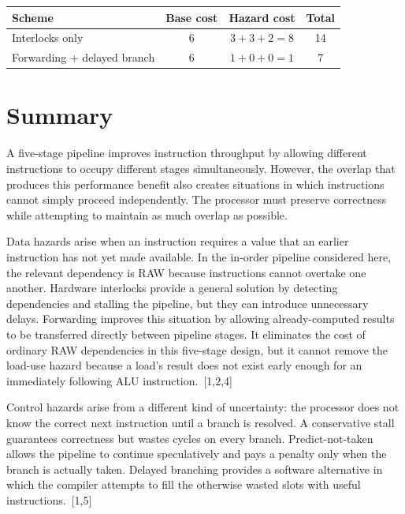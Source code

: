 \documentclass[11pt,a4paper]{report}
\begin{document}
\begin{center}
\begin{tabular}{lccc}
\toprule
Scheme & Base cost & Hazard cost & Total \\
\midrule
Interlocks only & 6 & $3+3+2=8$ & 14 \\
Forwarding + delayed branch & 6 & $1+0+0=1$ & 7 \\
\bottomrule
\end{tabular}
\end{center}

\section{Summary}
\label{sec:ch2-summary}

A five-stage pipeline improves instruction throughput by allowing different instructions to occupy different stages simultaneously. However, the overlap that produces this performance benefit also creates situations in which instructions cannot simply proceed independently. The processor must preserve correctness while attempting to maintain as much overlap as possible.

Data hazards arise when an instruction requires a value that an earlier instruction has not yet made available. In the in-order pipeline considered here, the relevant dependency is RAW because instructions cannot overtake one another. Hardware interlocks provide a general solution by detecting dependencies and stalling the pipeline, but they can introduce unnecessary delays. Forwarding improves this situation by allowing already-computed results to be transferred directly between pipeline stages. It eliminates the cost of ordinary RAW dependencies in this five-stage design, but it cannot remove the load-use hazard because a load's result does not exist early enough for an immediately following ALU instruction.~[1,2,4]

Control hazards arise from a different kind of uncertainty: the processor does not know the correct next instruction until a branch is resolved. A conservative stall guarantees correctness but wastes cycles on every branch. Predict-not-taken allows the pipeline to continue speculatively and pays a penalty only when the branch is actually taken. Delayed branching provides a software alternative in which the compiler attempts to fill the otherwise wasted slots with useful instructions.~[1,5]
\end{document}

